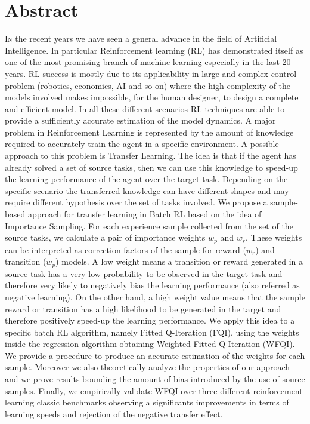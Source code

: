 
\cleardoublepage
{}

\begingroup
\let\cleardoublepage\relax
\let\cleardoublepage\relax

%
%
\chapter*{Abstract}
%
\lettrine[lines=2]{I}n the recent years we have seen a general advance in the field of Artificial Intelligence.
In particular Reinforcement learning (RL) has demonstrated itself as one of the most promising
branch of machine learning especially in the last 20 years.\newline
RL success is mostly due to its applicability in large and complex control
problem (robotics, economics, AI and so on) where the high complexity of the models
involved makes impossible, for the human designer, to design a complete and
efficient model. In all these different scenarios RL techniques are able to provide a sufficiently
accurate estimation of the model dynamics.\newline
A major problem in Reinforcement Learning is represented by the amount of knowledge required to
accurately train the agent in a specific environment.
A possible approach to this problem is Transfer Learning. The idea is that if the agent has already
solved a set of source tasks, then we can use this knowledge to speed-up the learning performance
of the agent over the target task. Depending on the specific scenario the transferred knowledge can
have different shapes and may require different hypothesis over the set of tasks involved.\newline
We propose a sample-based approach for transfer learning in Batch RL based on the idea of Importance Sampling.
For each experience sample collected from the set of the source tasks, we calculate a pair of importance
weights $w_p$ and $w_r$. These weights can be interpreted as correction factors of the sample for
reward ($w_r$) and transition ($w_p$) models. A low weight means a transition or reward generated
in a source task has a very low probability to be observed in the target task and therefore
very likely to negatively bias the learning performance (also referred as negative learning).
On the other hand, a high weight value means that the sample reward or transition has a high likelihood
to be generated in the target and therefore positively speed-up the learning performance.\newline
We apply this idea to a specific batch RL algorithm, namely Fitted Q-Iteration (FQI), using the weights
inside the regression algorithm obtaining Weighted Fitted Q-Iteration (WFQI). We provide a procedure to produce an accurate estimation of the weights
for each sample. Moreover we also theoretically analyze the properties of our approach and we prove results
bounding the amount of bias introduced by the use of source samples. Finally, we empirically validate WFQI over
three different reinforcement learning classic benchmarks observing a significants improvements in terms of
learning speeds and rejection of the negative transfer effect.

\medskip

%
\endgroup
